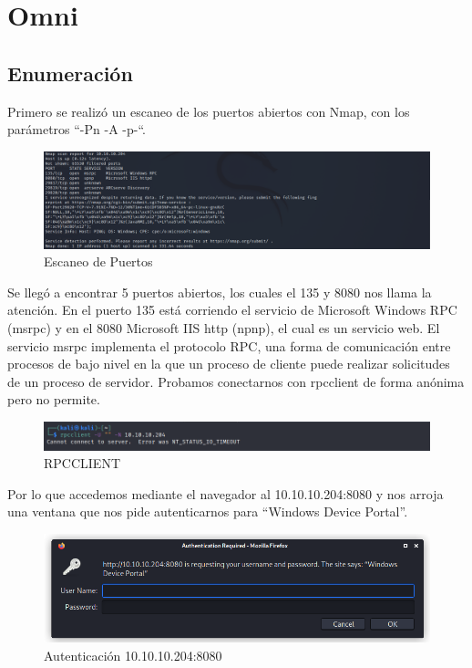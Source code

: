 \documentclass{article}
\begin{document}

\clearpage
\section{Omni}
\subsection{Enumeración}
Primero se realizó un escaneo de los puertos abiertos con Nmap, con los parámetros “-Pn -A -p-“.
\begin{figure}[H]
	\center
	\includegraphics[width=\textwidth]{images/omni/1.png}
	\caption{Escaneo de Puertos}
\end{figure}

Se llegó a encontrar 5 puertos abiertos, los cuales el 135 y 8080 nos llama la atención. En el puerto 135 está corriendo el servicio de Microsoft Windows RPC (msrpc) y en el 8080 Microsoft IIS http (npnp), el cual es un servicio web. El servicio msrpc implementa el protocolo RPC, una forma de comunicación entre procesos de bajo nivel en la que un proceso de cliente puede realizar solicitudes de un proceso de servidor.  Probamos conectarnos con rpcclient de forma anónima pero no permite.
\begin{figure}[H]
	\center
	\includegraphics[width=\textwidth]{images/omni/2.png}
	\caption{RPCCLIENT}
\end{figure}

Por lo que accedemos mediante el navegador al 10.10.10.204:8080 y nos arroja una ventana que nos pide autenticarnos para “Windows Device Portal”.
\begin{figure}[H]
	\center
	\includegraphics[width=\textwidth]{images/omni/3.png}
	\caption{Autenticación 10.10.10.204:8080}
\end{figure}
\end{document}
